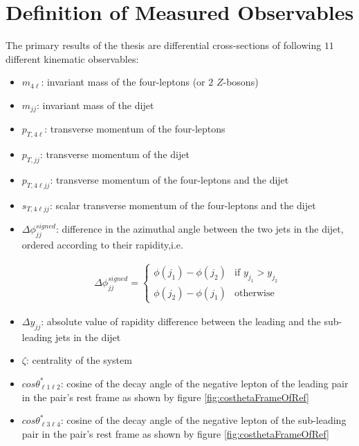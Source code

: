 \section{Definition of Measured Observables}
\label{sec:Obs}

The primary results of the thesis are differential cross-sections of following $11$ different kinematic observables:

\begin{itemize}

\item{	$m_{4\ell}$: invariant mass of the four-leptons (or $2$ $Z$-bosons)}
\item{ 	$m_{jj}$:  invariant mass of the dijet}
\item{	$p_{T,4\ell}$: transverse momentum of the four-leptons }
\item{	$p_{T, jj}$: transverse momentum of the dijet }
\item{	$p_{T,4\ell jj}$: transverse momentum of the four-leptons and the dijet }
\item{	$s_{T,4\ell jj}$: scalar transverse momentum of the four-leptons and the dijet }
\item{ 	$\Delta \phi _{jj}^{signed}$: difference in the azimuthal angle between the two jets in the dijet, ordered according to their rapidity,i.e. 

\begin{align*}
	\Delta \phi _{jj}^{signed} = 
	\begin{cases}
	\phi(j_1)-\phi(j_2) & \text{if $y_{j_1} > y_{j_2}$}\\
	\phi(j_2)-\phi(j_1) & \text{otherwise}
	\end{cases} 
\end{align*}
}
\item{ $\Delta y_{jj}$: absolute value of rapidity difference between the leading and the sub-leading jets in the dijet}
\item{ $\zeta$: centrality of the system}
\item{ $cos \theta^{*}_{\ell 1 \ell 2}$: cosine of the decay angle of the negative lepton of the leading pair in the pair's rest frame as shown by figure \ref{fig:costhetaFrameOfRef}}
\item{ $cos \theta^{*}_{\ell 3 \ell 4}$: cosine of the decay angle of the negative lepton of the sub-leading pair in the pair's rest frame as shown by figure \ref{fig:costhetaFrameOfRef} }

\end{itemize}

